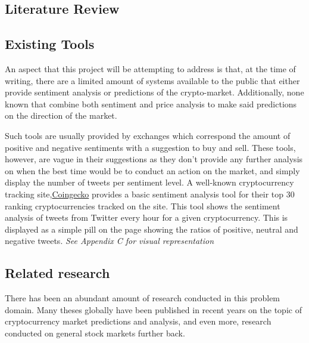 \documentclass[oneside, 12pt]{article}
\begin{document}
	\newpage
	
	\begin{center}
		\section{Literature Review}\label{literature}
	\end{center}
		\subsection{Existing Tools}
		An aspect that this project will be attempting to address is that, at the time of writing, there are a limited amount of systems available to the public that either provide sentiment analysis or predictions of the crypto-market. Additionally, none known that combine both sentiment and price analysis to make said predictions on the direction of the market.
		
		Such tools are usually provided by exchanges which correspond the amount of positive and negative sentiments with a suggestion to buy and sell. These tools, however, are vague in their suggestions as they don't provide any further analysis on when the best time would be to conduct an action on the market, and simply display the number of tweets per sentiment level. A well-known cryptocurrency tracking site,\href{https://www.coingecko.com}{Coingecko} provides a basic sentiment analysis tool for their top 30 ranking cryptocurrencies tracked on the site. This tool shows the sentiment analysis of tweets from Twitter every hour for a given cryptocurrency. This is displayed as a simple pill on the page showing the ratios of positive, neutral and negative tweets. \textit{See Appendix C for visual representation}
			
		\subsection{Related research}
		
		There has been an abundant amount of research conducted in this problem domain. Many theses globally have been published in recent years on the topic of cryptocurrency market predictions and analysis, and even more, research conducted on general stock markets further back. 
		
\end{document}
